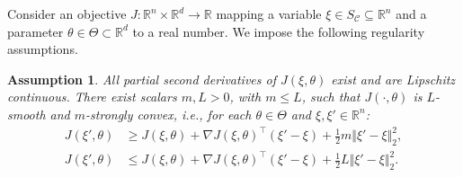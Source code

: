 \documentclass[letterpaper, 10 pt, conference]{ieeeconf}
\newcommand{\ra}{\rightarrow}
\newcommand{\R}{\mathbb{R}}
\newcommand{\?}{\stackrel{?}{=}}
\newcommand{\obj}{J}
\newcommand{\param}{\theta}
\newcommand{\paramDim}{d}
\newcommand{\paramSet}{\Theta}
\newcommand{\var}{\xi}
\newcommand{\varDim}{n}
\newcommand{\smoothnessConstant}{L}
\newcommand{\strongConvexityConstant}{m}
\newcommand{\constraintSet}{{S_{\mathcal{C}}}}
\newtheorem{assumption}{Assumption}
\newcommand{\frank}[1]{{\textcolor[rgb]{0,0,1}{\textsf{[Frank: {#1}]}}}}
\newcommand{\antoine}[1]{{\textcolor[rgb]{1,0,0}{\textsf{[Antoine: {#1}]}}}}
\begin{document}



Consider an objective $\obj: \R^\varDim \times \R^\paramDim \ra \R$ mapping a variable $\var \in \constraintSet \subseteq \R^\varDim$ and a parameter $\param \in \paramSet \subset \R^\paramDim$ to a real number.
We impose the following regularity assumptions.
\begin{assumption}
\label{Assump: Objective Properties}
All partial second derivatives of $\obj(\var, \param)$ exist and are Lipschitz continuous. 
There exist scalars
$\strongConvexityConstant, \smoothnessConstant > 0$, with $\strongConvexityConstant \leq \smoothnessConstant$, such that $\obj(\cdot, \param)$ is $\smoothnessConstant$-smooth and $\strongConvexityConstant$-strongly convex, 
i.e., for each $\param \in \paramSet$ 
and $\var, \var' \in \R^\varDim$:
\begin{align} \nonumber
    \obj(\var', \param) &\geq \obj(\var, \param) + \nabla \obj(\var, \param)^\top (\var' - \var) + \textstyle\frac{1}{2}\strongConvexityConstant \Vert \var' - \var \Vert_2^2, \\ \nonumber
    \obj(\var', \param) &\leq \obj(\var, \param) + \nabla \obj(\var, \param)^\top (\var' - \var) + \textstyle\frac{1}{2}\smoothnessConstant \Vert \var' - \var \Vert_2^2.
\end{align}
\end{assumption}
\end{document}
